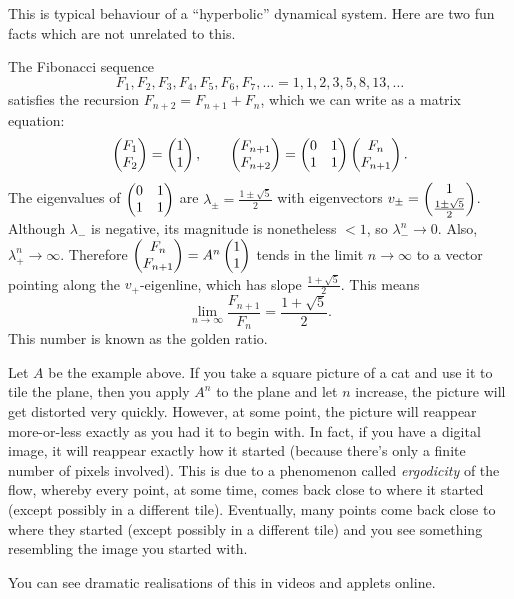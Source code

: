 \documentclass{article}
\begin{document}
This is typical behaviour of a ``hyperbolic'' dynamical system. Here
are two fun facts which are not unrelated to this.


\begin{Example}\label{exm:fib}
The Fibonacci sequence
\[F_1,F_2,F_3,F_4,F_5,F_6,F_7,\ldots=1,1,2,3,5,8,13,\ldots\]
satisfies the recursion \(F_{n+2}=F_{n+1}+F_n\), which we can write
as a matrix equation: \[\begin{pmatrix} F_1 \\ F_2\end{pmatrix}=\begin{pmatrix} 1 \\ 1\end{pmatrix},\qquad\begin{pmatrix}
F_{n+1} \\ F_{n+2}\end{pmatrix}=\begin{pmatrix} 0 & 1 \\ 1 & 1 \end{pmatrix}\begin{pmatrix} F_n \\ F_{n+1}
\end{pmatrix}.\] The eigenvalues of \(\begin{pmatrix} 0 & 1 \\ 1 & 1 \end{pmatrix}\) are
\(\lambda_{\pm}=\frac{1\pm\sqrt{5}}{2}\) with eigenvectors
\(v_{\pm}=\begin{pmatrix} 1
\\ \frac{1\pm\sqrt{5}}{2}\end{pmatrix}\). Although \(\lambda_-\) is negative,
its magnitude is nonetheless \(<1\), so \(\lambda_-^n\to 0\). Also,
\(\lambda_+^n\to\infty\). Therefore \(\begin{pmatrix} F_n \\ F_{n+1}\end{pmatrix}=A^n\begin{pmatrix} 1
\\ 1 \end{pmatrix}\) tends in the limit \(n\to\infty\) to a vector pointing
along the \(v_+\)-eigenline, which has slope
\(\frac{1+\sqrt{5}}{2}\). This means
\[\lim_{n\to\infty}\frac{F_{n+1}}{F_n}=\frac{1+\sqrt{5}}{2}.\]
This number is known as the golden ratio.


\end{Example}
\begin{Example}\label{exm:arncat}
Let \(A\) be the example above. If you take a square picture of a
cat and use it to tile the plane, then you apply \(A^n\) to the
plane and let \(n\) increase, the picture will get distorted very
quickly. However, at some point, the picture will reappear
more-or-less exactly as you had it to begin with. In fact, if you
have a digital image, it will reappear exactly how it started
(because there's only a finite number of pixels involved). This is
due to a phenomenon called {\em ergodicity} of the flow, whereby
every point, at some time, comes back close to where it started
(except possibly in a different tile). Eventually, many points come
back close to where they started (except possibly in a different
tile) and you see something resembling the image you started with.


\end{Example}
You can see dramatic realisations of this in videos and applets
online.
\end{document}
